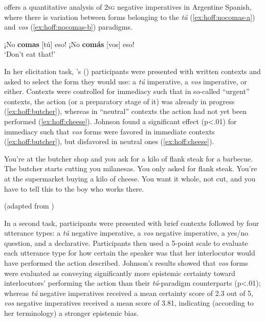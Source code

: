 \documentclass[output=paper,colorlinks,citecolor=brown]{langscibook}
\begin{document}
\citet{Johnson2013} offers a quantitative analysis of \textsc{2sg} negative imperatives in Argentine Spanish, where there is variation between forms belonging to the \textit{tú} (\ref{ex:hoff:nocomas-a}) and \textit{vos} (\ref{ex:hoff:nocomas-b}) paradigms.

\begin{exe}
\ex\label{ex:hoff:nocomas}
\begin{xlist}
\ex \label{ex:hoff:nocomas-a} ¡No \textbf{comas} [tú] eso! 
\ex \label{ex:hoff:nocomas-b} ¡No \textbf{comás} [vos] eso!\\
`Don’t eat that!'
\end{xlist}
\end{exe}

In her elicitation task, \citeauthor{Johnson2013}’s (\citeyear{Johnson2013}) participants were presented with written contexts and asked to select the form they would use: a \textit{tú} imperative, a \textit{vos} imperative, or either. Contexts were controlled for immediacy such that in so-called ``urgent'' contexts, the action (or a preparatory stage of it) was already in progress (\ref{ex:hoff:butcher}), whereas in ``neutral'' contexts the action had not yet been performed (\ref{ex:hoff:cheese}). Johnson found a significant effect (p<.01) for immediacy such that \textit{vos} forms were favored in immediate contexts (\ref{ex:hoff:butcher}), but disfavored in neutral ones (\ref{ex:hoff:cheese}).
  
\begin{exe}
\ex
\begin{xlist}
\ex\label{ex:hoff:butcher} You’re at the butcher shop and you ask for a kilo of flank steak for a barbecue. The butcher starts cutting you milanesas. You only asked for flank steak.
\ex\label{ex:hoff:cheese} You’re at the supermarket buying a kilo of cheese. You want it whole, not cut, and you have to tell this to the boy who works there.
\end{xlist}
(adapted from \citealt[168]{Johnson2013})
\end{exe}

In a second task, participants were presented with brief contexts followed by four utterance types: a \textit{tú} negative imperative, a \textit{vos} negative imperative, a yes/no question, and a declarative. Participants then used a 5-point scale to evaluate each utterance type for how certain the speaker was that her interlocutor would have performed the action described. Johnson’s results showed that \textit{vos} forms were evaluated as conveying significantly more epistemic certainty toward interlocutors' performing the action than their \textit{tú}-paradigm counterparts (p<.01); whereas \textit{tú} negative imperatives received a mean certainty score of 2.3 out of 5, \textit{vos} negative imperatives received a mean score of 3.81, indicating (according to her terminology) a stronger epistemic bias.
\end{document}
